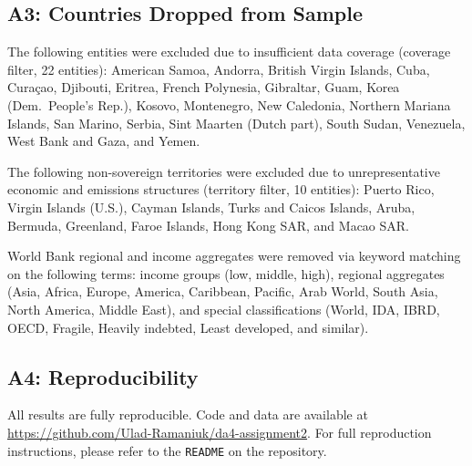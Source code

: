 \documentclass[12pt, a4paper]{article}
\begin{document}
\subsection*{A3: Countries Dropped from Sample}

The following entities were excluded due to insufficient data coverage (coverage filter, 22 entities): American Samoa, Andorra, British Virgin Islands, Cuba, Cura\c{c}ao, Djibouti, Eritrea, French Polynesia, Gibraltar, Guam, Korea (Dem.\ People's Rep.), Kosovo, Montenegro, New Caledonia, Northern Mariana Islands, San Marino, Serbia, Sint Maarten (Dutch part), South Sudan, Venezuela, West Bank and Gaza, and Yemen. 

The following non-sovereign territories were excluded due to unrepresentative economic and emissions structures (territory filter, 10 entities): Puerto Rico, Virgin Islands (U.S.), Cayman Islands, Turks and Caicos Islands, Aruba, Bermuda, Greenland, Faroe Islands, Hong Kong SAR, and Macao SAR.

 World Bank regional and income aggregates were removed via keyword matching on the following terms: income groups (low, middle, high), regional aggregates (Asia, Africa, Europe, America, Caribbean, Pacific, Arab World, South Asia, North America, Middle East), and special classifications (World, IDA, IBRD, OECD, Fragile, Heavily indebted, Least developed, and similar).
 
\subsection*{A4: Reproducibility}
 
All results are fully reproducible. Code and data are available at
\url{https://github.com/Ulad-Ramaniuk/da4-assignment2}.
For full reproduction instructions, please refer to the \texttt{README} on the repository.
 
\end{document}
